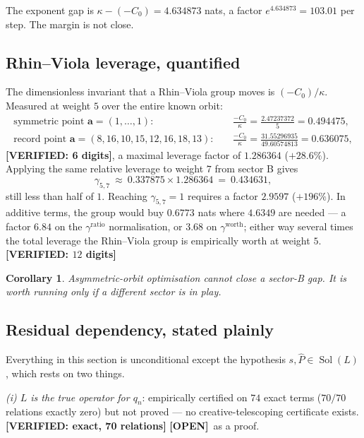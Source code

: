 \documentclass[11pt,reqno]{amsart}
\theoremstyle{plain}
\newtheorem{corollary}[theorem]{Corollary}
\theoremstyle{definition}
\theoremstyle{remark}
\newcommand{\VER}[1]{{\normalfont\sffamily\bfseries[VERIFIED: #1]}}
\newcommand{\OPEN}{{\normalfont\sffamily\bfseries[OPEN]}}
\DeclareMathOperator{\Sol}{Sol}
\newcommand{\Phat}{\widehat{P}}
\begin{document}
The exponent gap is $\kappa-(-C_0)=4.634873$ nats, a factor $e^{4.634873}=103.01$ per step. The
margin is not close.

\subsection{Rhin--Viola leverage, quantified}\label{sec:rv}
The dimensionless invariant that a Rhin--Viola group \cite{RV96,RV01} moves is $(-C_0)/\kappa$.
Measured at weight $5$ over the entire known orbit:
\[
\begin{aligned}
  \text{symmetric point } \boldsymbol a=(1,\dots,1):\quad
    &\frac{-C_0}{\kappa}=\frac{2.47237372}{5}=0.494475,\\[2pt]
  \text{record point } \boldsymbol a=(8,16,10,15,12,16,18,13):\quad
    &\frac{-C_0}{\kappa}=\frac{31.55296935}{49.60574813}=0.636075,
\end{aligned}
\]
\VER{6 digits}, a maximal leverage factor of $1.286364$ ($+28.6\%$). Applying the same relative
leverage to weight $7$ from sector B gives
\[
  \gamma_{5,7}\ \approx\ 0.337875\times1.286364\ =\ 0.434631,
\]
still less than half of $1$. Reaching $\gamma_{5,7}=1$ requires a factor $2.9597$ ($+196\%$).
In additive terms, the group would buy $0.6773$ nats where $4.6349$ are needed --- a factor
$6.84$ on the $\gamma^{\mathrm{ratio}}$ normalisation, or $3.68$ on $\gamma^{\mathrm{worth}}$;
either way several times the total leverage the Rhin--Viola group is empirically worth
at weight $5$. \VER{$12$ digits}

\begin{corollary}\label{cor:norv}
Asymmetric-orbit optimisation cannot close a sector-B gap. It is worth running only if a
different sector is in play.
\end{corollary}

\subsection{Residual dependency, stated plainly}\label{sec:residual}
Everything in this section is unconditional except the hypothesis $s,\Phat\in\Sol(L)$, which rests
on two things.

\emph{(i) $L$ is the true operator for $q_n$}: empirically certified on $74$ exact terms
($70/70$ relations exactly zero) but not proved --- no creative-telescoping certificate exists.
\VER{exact, 70 relations} \OPEN\ as a proof.
\end{document}
